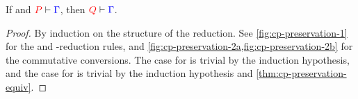 \begin{theorem}[Preservation]\label{thm:cp-preservation}
  If  and $\seq[{ P }]{ \Gamma }$, then $\seq[{ Q }]{ \Gamma }$.
\end{theorem}
\begin{proof}
  By induction on the structure of the reduction. See
  \cref{fig:cp-preservation-1} for the  and \textbeta-reduction
  rules, and \cref{fig:cp-preservation-2a,fig:cp-preservation-2b} for the
  commutative conversions.
  The case for \cpRedGammaCut is trivial by the induction hypothesis, and the
  case for \cpRedGammaEquiv is trivial by the induction hypothesis and
  \cref{thm:cp-preservation-equiv}. 
\end{proof}
